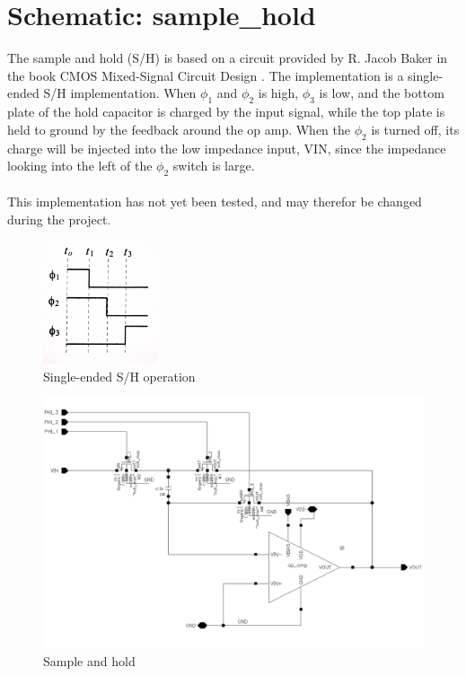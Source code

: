 \documentclass[english, a4paper,11pt]{article}
\begin{document}
\section*{Schematic: sample\_hold}
The sample and hold (S/H) is based on a circuit provided by R. Jacob Baker in the book CMOS Mixed-Signal Circuit Design \cite{baker}. The implementation is a single-ended S/H implementation. 
When $\phi_{1}$ and $\phi_{2}$ is high, $\phi_{3}$ is low, and the bottom plate of the hold capacitor is charged by the input signal, while the top plate is held to ground by the feedback around the 
op amp. When the $\phi_{2}$ is turned off, its charge will be injected into the low impedance input, VIN, since the impedance looking into the left of the $\phi_{2}$ switch is large.\\
\\
This implementation has not yet been tested, and may therefor be changed during the project.\\
\begin{figure}[!ht]
 \centering
   \includegraphics[width=0.3\textwidth]{img/timing_sample_hold.jpg}
   \caption{Single-ended S/H operation \cite{baker}}
   \label{timing}
\end{figure}
\begin{figure}[!ht]
 \centering
   \includegraphics[width=\textwidth]{img/sample_hold}
   \caption{Sample and hold}
   \label{sample:hold}
\end{figure}
\end{document}

